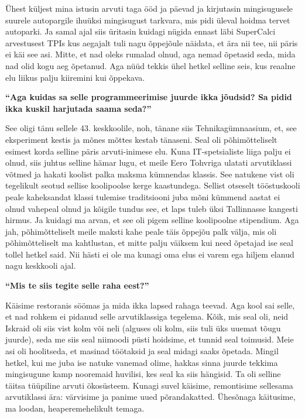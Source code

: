 Ühest küljest  mina istusin arvuti taga ööd ja päevad ja kirjutasin 
mingisugusele suurele autopargile ihuüksi  mingisugust tarkvara, mis pidi 
üleval hoidma tervet autoparki. Ja samal ajal siis üritasin kuidagi nügida 
ennast läbi SuperCalci arvestusest TPIs kus 
aegajalt tuli nagu õppejõule näidata, et ära nii tee, nii päris ei käi see asi. 
Mitte, et nad oleks rumalad olnud, aga nemad õpetasid seda, mida nad olid kogu 
aeg õpetanud. Aga nüüd tekkis ühel hetkel selline seis, kus reaalne elu liikus 
palju kiiremini kui õppekava.

\textbf{\enquote{Aga kuidas sa selle programmeerimise juurde ikka jõudsid? Sa 
pidid ikka kuskil harjutada saama seda?}}

See oligi  tänu sellele 43. keskkoolile, noh, tänane siis 
Tehnikagümnaasium, 
et, see eksperiment kestis ja mõnes mõttes kestab tänaseni. Seal oli 
põhimõtteliselt  esimest korda selline päris arvuti-inimese elu. Kuna 
IT-spetsialiste  liiga palju ei olnud, siis juhtus selline hämar lugu, et meile 
Eero Tohvriga ulatati arvutiklassi võtmed ja hakati 
koolist palka maksma kümnendas klassis. See natukene vist oli tegelikult seotud 
sellise koolipoolse kerge kaastundega. Sellist otseselt tööstuskooli peale 
kaheksandat klassi tulemise traditsiooni juba mõni kümmend aastat ei olnud 
vahepeal olnud ja kõigile tundus see, et laps tuleb üksi Tallinnasse kangesti 
hirmus. Ja kuidagi ma arvan, et see oli pigem selline koolipoolne stipendium. 
Aga jah, põhimõtteliselt meile maksti kahe peale täis õppejõu palk välja, mis 
oli põhimõtteliselt ma kahtlustan, et mitte palju väiksem kui need õpetajad 
ise seal tollel hetkel said. Nii hästi ei ole ma kunagi oma elus ei varem ega 
hiljem elanud nagu keskkooli ajal. 

\textbf{\enquote{Mis te siis tegite selle raha eest?}}

Käisime restoranis söömas ja mida ikka lapsed rahaga teevad. Aga kool sai 
selle, et nad rohkem ei pidanud selle arvutiklassiga tegelema.  Kõik, mis seal 
oli, neid 
Iskraid oli 
siis vist kolm või neli (alguses oli kolm, siis tuli üks uuemat tõugu juurde), 
seda me siis seal niimoodi püsti hoidsime, et tunnid seal toimusid. Meie asi 
oli hoolitseda, et masinad töötaksid ja seal midagi saaks õpetada. Mingil 
hetkel, kui me juba ise natuke vanemad olime, hakkas sinna juurde tekkima 
mingisugune kamp nooremaid huvilisi, kes seal ka siis hängisid. Ta oli selline 
täitsa tüüpiline arvuti ökosüsteem. Kunagi suvel käisime, remontisime sellesama 
arvutiklassi ära: värvisime ja panime uued põrandakatted. Ühesõnaga käitusime, 
ma loodan,  heaperemehelikult temaga. 

